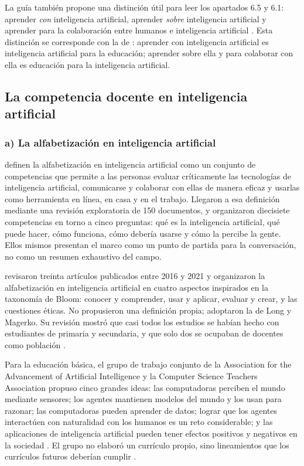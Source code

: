 La guía también propone una distinción útil para leer los apartados 6.5 y 6.1: aprender
\textit{con} inteligencia artificial, aprender \textit{sobre} inteligencia artificial y
aprender para la colaboración entre humanos e inteligencia artificial
\citep[p.~13]{miao2021guidance}. Esta distinción se corresponde con la de
\citet{schiff2022education}: aprender con inteligencia artificial es inteligencia
artificial para la educación; aprender sobre ella y para colaborar con ella es educación
para la inteligencia artificial.

\subsection{La competencia docente en inteligencia artificial}
\label{subsec:mt-docente}

\subsubsection*{a) La alfabetización en inteligencia artificial}

\citet{long2020ailiteracy} definen la alfabetización en inteligencia artificial como un
conjunto de competencias que permite a las personas evaluar críticamente las tecnologías de
inteligencia artificial, comunicarse y colaborar con ellas de manera eficaz y usarlas como
herramienta en línea, en casa y en el trabajo. Llegaron a esa definición mediante una
revisión exploratoria de 150 documentos, y organizaron diecisiete competencias en torno a
cinco preguntas: qué es la inteligencia artificial, qué puede hacer, cómo funciona, cómo
debería usarse y cómo la percibe la gente. Ellos mismos presentan el marco como un punto de
partida para la conversación, no como un resumen exhaustivo del campo.

\citet{ng2021ailiteracy} revisaron treinta artículos publicados entre 2016 y 2021 y
organizaron la alfabetización en inteligencia artificial en cuatro aspectos inspirados en
la taxonomía de Bloom: conocer y comprender, usar y aplicar, evaluar y crear, y las
cuestiones éticas. No propusieron una definición propia; adoptaron la de Long y Magerko.
Su revisión mostró que casi todos los estudios se habían hecho con estudiantes de primaria
y secundaria, y que solo dos se ocupaban de docentes como población
\citep[p.~3]{ng2021ailiteracy}.

Para la educación básica, el grupo de trabajo conjunto de la Association for the
Advancement of Artificial Intelligence y la Computer Science Teachers Association propuso
cinco grandes ideas: las computadoras perciben el mundo mediante sensores; los agentes
mantienen modelos del mundo y los usan para razonar; las computadoras pueden aprender de
datos; lograr que los agentes interactúen con naturalidad con los humanos es un reto
considerable; y las aplicaciones de inteligencia artificial pueden tener efectos positivos
y negativos en la sociedad \citep[pp.~9797--9798]{touretzky2019k12ai}. El grupo no
elaboró un currículo propio, sino lineamientos que los currículos futuros deberían
cumplir \citep[p.~9798]{touretzky2019k12ai}.


